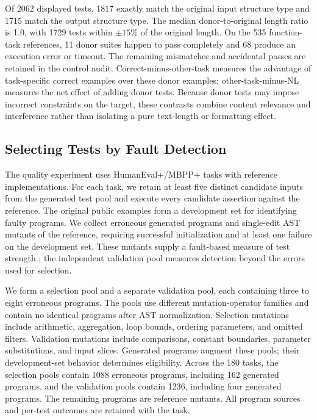 \documentclass[acmsmall,screen,review,anonymous]{acmart}
\begin{document}
Of 2062 displayed tests, 1817 exactly match the original input structure type and 1715 match the output structure type.
The median donor-to-original length ratio is 1.0, with 1729 tests within $\pm15\%$ of the original length.
On the 535 function-task references, 11 donor suites happen to pass completely and 68 produce an execution error or timeout.
The remaining mismatches and accidental passes are retained in the control audit.
Correct-minus-other-task measures the advantage of task-specific correct examples over these donor examples; other-task-minus-NL measures the net effect of adding donor tests.
Because donor tests may impose incorrect constraints on the target, these contrasts combine content relevance and interference rather than isolating a pure text-length or formatting effect.

\subsection{Selecting Tests by Fault Detection}

The quality experiment uses \QualityTasks{} HumanEval+/MBPP+ tasks with reference implementations.
For each task, we retain at least five distinct candidate inputs from the generated test pool and execute every candidate assertion against the reference.
The original public examples form a development set for identifying faulty programs.
We collect erroneous generated programs and single-edit AST mutants of the reference, requiring successful initialization and at least one failure on the development set.
These mutants supply a fault-based measure of test strength \citep{jia2011mutation}; the independent validation pool measures detection beyond the errors used for selection.

We form a selection pool and a separate validation pool, each containing three to eight erroneous programs.
The pools use different mutation-operator families and contain no identical programs after AST normalization.
Selection mutations include arithmetic, aggregation, loop bounds, ordering parameters, and omitted filters.
Validation mutations include comparisons, constant boundaries, parameter substitutions, and input slices.
Generated programs augment these pools; their development-set behavior determines eligibility.
Across the 180 tasks, the selection pools contain 1088 erroneous programs, including 162 generated programs, and the validation pools contain 1236, including four generated programs.
The remaining programs are reference mutants.
All program sources and per-test outcomes are retained with the task.
\end{document}
